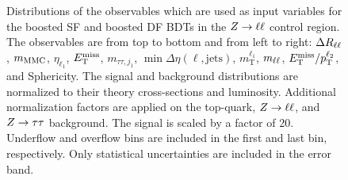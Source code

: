 \begin{figure}[htb]
\begin{subfigure}[t]{0.3\textwidth}
    \end{subfigure}
    \caption{Distributions of the observables which are used as input variables for the boosted SF and boosted DF BDTs in the $Z \to \ell \ell$ control region.
             The observables are from top to bottom and from left to right: $\Delta R_{\ell\ell}$, $m_\text{MMC}$, $\eta_{\ell_1}$, $E_\text{T}^\text{miss}$, $m_{\tau\tau,j_{1}}$,
             $\min \Delta \eta (\ell, \text{jets})$, $m_\text{T}^{\ell_1}$, $m_{\ell\ell}$, $E_\text{T}^\text{miss} / p_\text{T}^{\ell_2}$, and Sphericity.
             The signal and background distributions are normalized to their theory cross-sections and luminosity.
             Additional normalization factors are applied on the top-quark, $Z \to \ell \ell$, and $Z \to \tau \tau$ background.
             The signal is scaled by a factor of 20.
             Underflow and overflow bins are included in the first and last bin, respectively.
             Only statistical uncertainties are included in the error band.}\label{fig:mva:modeling:cr:boostzll}
\end{figure}

